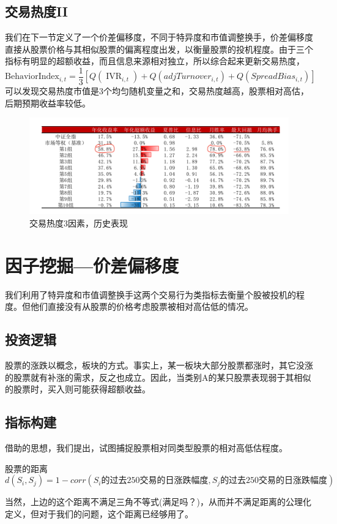 \documentclass[12pt]{article}
\theoremstyle{definition}
\begin{document}
\subsection{交易热度II}
我们在下一节定义了一个价差偏移度，不同于特异度和市值调整换手，价差偏移度直接从股票价格与其相似股票的偏离程度出发，以衡量股票的投机程度。由于三个指标有明显的超额收益，而且信息来源相对独立，所以综合起来更新交易热度，
$$ 
\text{BehaviorIndex}_{i, t}=\frac{1}{3}\left[Q\left(\operatorname{IVR}_{i, t}\right)+Q\left( adjTurnover_{i, t}\right)+Q(SpreadBias_{i,t})\right]
$$
可以发现交易热度市值是3个均匀随机变量之和，交易热度越高，股票相对高估，后期预期收益率较低。

\begin{figure}[htb]
	\centering
	\includegraphics[scale=0.5]{figure/交易热度3因素_历史表现.png}
	\caption{交易热度3因素，历史表现}
\end{figure}


\section{因子挖掘—价差偏移度}
我们利用了特异度和市值调整换手这两个交易行为类指标去衡量个股被投机的程度。但他们直接没有从股票的价格考虑股票被相对高估低的情况。
\subsection{投资逻辑}
股票的涨跌以概念，板块的方式。事实上，某一板块大部分股票都涨时，其它没涨的股票就有补涨的需求，反之也成立。因此，当类别A的某只股票表现弱于其相似的股票时，买入则可能获得超额收益。
\subsection{指标构建}
借助的思想，我们提出，试图捕捉股票相对同类型股票的相对高低估程度。
\begin{sdefinition}{股票的距离}{}
$$
d(S_i,S_j) = 1 - corr(S_i\text{的过去250交易的日涨跌幅度},S_j\text{的过去250交易的日涨跌幅度}) 
$$
\end{sdefinition}
当然，上边的这个距离不满足三角不等式(满足吗？)，从而并不满足距离的公理化定义，但对于我们的问题，这个距离已经够用了。
\end{document}
